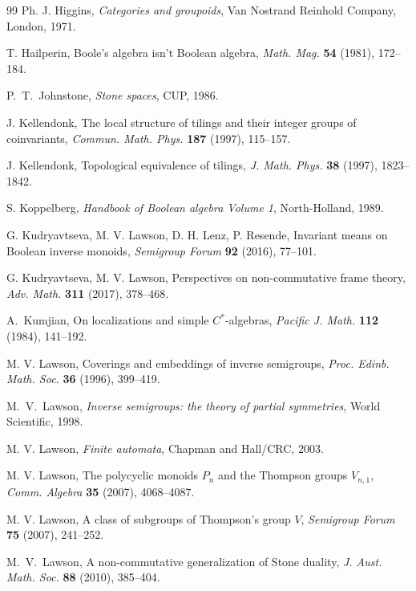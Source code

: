 \documentclass[a4paper]{amsart}
\begin{document}
\begin{thebibliography}{99}
 Ph. J. Higgins, {\em Categories and groupoids}, Van Nostrand Reinhold Company, London, 1971.

 T. Hailperin, Boole's algebra isn't Boolean algebra, {\em Math. Mag.} {\bf 54} (1981), 172--184.

 P.~T.~Johnstone, {\em Stone spaces}, CUP, 1986.

 J. Kellendonk, The local structure of tilings and their integer groups of coinvariants, {\em Commun. Math. Phys.}
{\bf 187} (1997), 115--157.

 J. Kellendonk, Topological equivalence of tilings, {\em J. Math. Phys.} {\bf 38} (1997), 1823--1842.

 S. Koppelberg, {\em Handbook of Boolean algebra Volume 1}, North-Holland, 1989.

 G. Kudryavtseva, M. V. Lawson, D. H. Lenz, P. Resende, Invariant means on Boolean inverse monoids, {\em Semigroup Forum} {\bf 92} (2016), 77--101.

 G. Kudryavtseva, M. V. Lawson, Perspectives on non-commutative frame theory, {\em Adv. Math.} {\bf 311} (2017), 378--468.

 A.~Kumjian, On localizations and simple $C^{\ast}$-algebras, {\em Pacific J. Math.} {\bf 112} (1984), 141--192.

 M. V. Lawson, Coverings and embeddings of inverse semigroups, {\em Proc. Edinb. Math. Soc.} {\bf 36} (1996), 399--419. 

 M.~V.~Lawson, {\em Inverse semigroups: the theory of partial symmetries}, World Scientific, 1998.

 M. V. Lawson, {\em Finite automata}, Chapman and Hall/CRC, 2003.

 M. V. Lawson, The polycyclic monoids $P_{n}$ and the Thompson groups $V_{n,1}$, {\em Comm. Algebra} {\bf 35} (2007), 4068--4087.

 M. V. Lawson, A class of subgroups of Thompson's group $V$, {\em Semigroup Forum} {\bf 75} (2007), 241--252.

 M.~V.~Lawson, A non-commutative generalization of Stone duality, {\em J. Aust. Math. Soc.} {\bf 88} (2010), 385--404.


\end{thebibliography}
\end{document}
